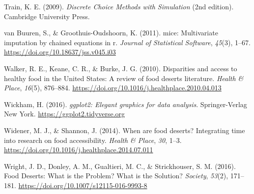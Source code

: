 \documentclass[
  letterpaper,
  number,
  review,
  doubleblind,
  3p]{elsarticle}
\newlength{\cslhangindent}
\newenvironment{CSLReferences}[2] %
 {\begin{list}{}{%
  \setlength{\itemindent}{0pt}
  \setlength{\leftmargin}{0pt}
  \setlength{\parsep}{0pt}
  \ifodd #1
   \setlength{\leftmargin}{\cslhangindent}
   \setlength{\itemindent}{-1\cslhangindent}
  \fi
  \setlength{\itemsep}{#2\baselineskip}}}
 {\end{list}}
\begin{document}
\begin{CSLReferences}{1}{0}
Train, K. E. (2009). \emph{Discrete {Choice Methods} with {Simulation}}
(2nd edition). Cambridge University Press.

van Buuren, S., \& Groothuis-Oudshoorn, K. (2011). {mice}: Multivariate
imputation by chained equations in r. \emph{Journal of Statistical
Software}, \emph{45}(3), 1--67.
\url{https://doi.org/10.18637/jss.v045.i03}

Walker, R. E., Keane, C. R., \& Burke, J. G. (2010). Disparities and
access to healthy food in the {United States}: {A} review of food
deserts literature. \emph{Health \& Place}, \emph{16}(5), 876--884.
\url{https://doi.org/10.1016/j.healthplace.2010.04.013}

Wickham, H. (2016). \emph{ggplot2: Elegant graphics for data analysis}.
Springer-Verlag New York. \url{https://ggplot2.tidyverse.org}

Widener, M. J., \& Shannon, J. (2014). When are food deserts?
{Integrating} time into research on food accessibility. \emph{Health \&
Place}, \emph{30}, 1--3.
\url{https://doi.org/10.1016/j.healthplace.2014.07.011}

Wright, J. D., Donley, A. M., Gualtieri, M. C., \& Strickhouser, S. M.
(2016). Food {Deserts}: {What} is the {Problem}? {What} is the
{Solution}? \emph{Society}, \emph{53}(2), 171--181.
\url{https://doi.org/10.1007/s12115-016-9993-8}

\end{CSLReferences}
\end{document}
